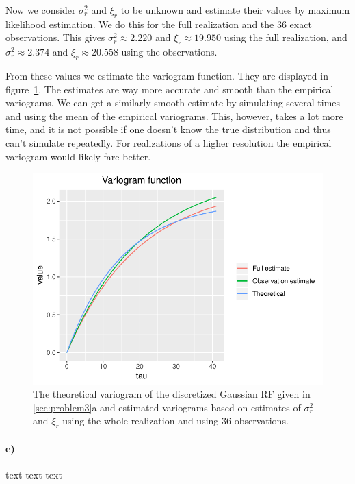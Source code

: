 Now we consider $\sigma_r^2$ and $\xi_r$ to be unknown and estimate their values by maximum likelihood estimation. We do this for the full realization and the 36 exact observations. This gives $\sigma_r^2 \approx 2.220$ and $\xi_r \approx 19.950$ using the full realization, and $\sigma_r^2 \approx 2.374$ and $\xi_r \approx 20.558$ using the observations. 

From these values we estimate the variogram function. They are displayed in figure~\ref{fig:3c_variogram_estimates}. The estimates are way more accurate and smooth than the empirical variograms. We can get a similarly smooth estimate by simulating several times and using the mean of the empirical variograms. This, however, takes a lot more time, and it is not possible if one doesn't know the true distribution and thus can't simulate repeatedly. For realizations of a higher resolution the empirical variogram would likely fare better.

\begin{figure}
    \centering
    \includegraphics[scale=0.95]{figures/3c_variogram_estimates.pdf}
    \caption{The theoretical variogram of the discretized Gaussian RF given in \ref{sec:problem3}a and estimated variograms based on estimates of $\sigma_r^2$ and $\xi_r$ using the whole realization and using 36 observations.}
    \label{fig:3c_variogram_estimates}
\end{figure}

\paragraph{e)}
text text text

